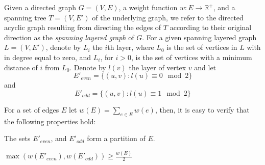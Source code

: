 Given a directed graph $G = (V, E)$,
a weight function $w : E \rightarrow \mathbb{R^+}$, 
and a spanning tree $T = (V, E')$ of the underlying graph, 
we refer to the directed acyclic graph resulting from directing the edges 
of $T$ according to their original direction as the \emph{spanning layered graph}
of $G$.
For a given spanning layered graph $L = (V, E')$, denote by $L_i$ the $i$th
layer, where $L_0$ is the set of vertices in $L$ with in degree equal to zero,
and $L_i$, for $i > 0$, is the set of vertices with a minimum distance of $i$ from $L_0$.
Denote by $l(v)$ the layer of vertex $v$ and let 
$$ E'_{even} = \{ (u, v) : l(u) \equiv 0 \mod 2 \} $$
and    
$$ E'_{odd} = \{ (u, v) : l(u) \equiv 1 \mod 2 \} $$

For a set of edges $E$ let $w(E) = \sum_{e \in E}{w(e)}$, 
then, it is easy to verify that the following properties hold:

\begin{observation}
The sets $E'_{even}$, and $E'_{odd}$ form a partition of $E$. 
\end{observation}

\begin{observation}
\label{ob:geq_half}
$ \max(w(E'_{even}), w(E'_{odd}))  \geq \frac{w(E)}{2} $
\end{observation}